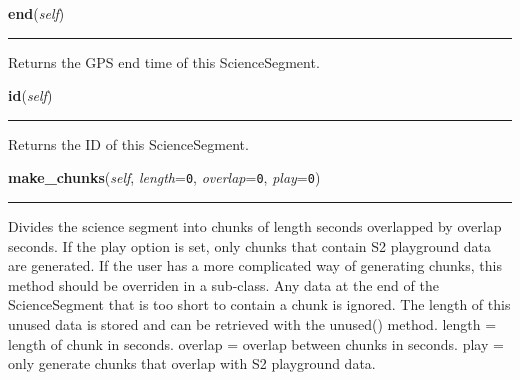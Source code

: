     \noindent\begin{boxedminipage}{\textwidth}

    \raggedright \textbf{end}(\textit{self})

    \vspace{-1.5ex}

    \rule{\textwidth}{0.5\fboxrule}
    Returns the GPS end time of this ScienceSegment.

    \vspace{1ex}

    \end{boxedminipage}

    \label{pipeline:ScienceSegment:id}
    \vspace{0.5ex}

    \noindent\begin{boxedminipage}{\textwidth}

    \raggedright \textbf{id}(\textit{self})

    \vspace{-1.5ex}

    \rule{\textwidth}{0.5\fboxrule}
    Returns the ID of this ScienceSegment.

    \vspace{1ex}

    \end{boxedminipage}

    \label{pipeline:ScienceSegment:make_chunks}
    \vspace{0.5ex}

    \noindent\begin{boxedminipage}{\textwidth}

    \raggedright \textbf{make\_chunks}(\textit{self}, \textit{length}=\texttt{0\-}, \textit{overlap}=\texttt{0\-}, \textit{play}=\texttt{0\-})

    \vspace{-1.5ex}

    \rule{\textwidth}{0.5\fboxrule}
    Divides the science segment into chunks of length seconds overlapped 
    by overlap seconds. If the play option is set, only chunks that 
    contain S2 playground data are generated. If the user has a more 
    complicated way of generating chunks, this method should be overriden 
    in a sub-class. Any data at the end of the ScienceSegment that is too 
    short to contain a chunk is ignored. The length of this unused data 
    is stored and can be retrieved with the unused() method. length = 
    length of chunk in seconds. overlap = overlap between chunks in 
    seconds. play = only generate chunks that overlap with S2 playground 
    data.

    \vspace{1ex}

    \end{boxedminipage}

